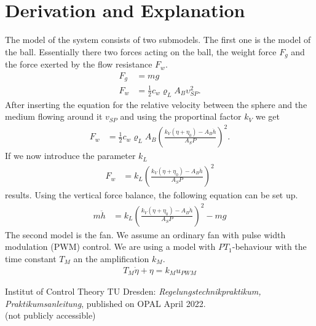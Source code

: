 \documentclass[10pt,a4paper]{article}
\begin{document}
	
	\section{Derivation and Explanation} %
	The model of the system consists of two submodels. The first one is the model of the ball. Essentially there two forces acting on the ball, the weight force $F_g$ and the force exerted by the flow resistance $F_w$.   
	\begin{align}
		F_g &= mg \\
		F_w &= \frac{1}{2} c_w \varrho_L A_B \upsilon_{SP}^2.
	\end{align}
	After inserting the equation for the relative velocity between the sphere and the medium flowing around it $v_{SP}$ and using the proportinal factor $k_V$ we get
	\begin{align}
		F_w &= \frac{1}{2} c_w \varrho_L A_B \left(\frac{k_V(\eta + \eta_0) - A_B \dot{h}}{A_SP}\right)^2.
	\end{align}
	If we now introduce the parameter $k_L$ 
	\begin{align}
		F_w &= k_L \left(\frac{k_V(\eta +\eta_0) - A_B\dot{h}}{A_SP}\right)^2
	\end{align} 
	results.
	Using the vertical force balance, the following equation can be set up.
	\begin{align}
		m\ddot{h}&= k_L \left(\frac{k_V(\eta +\eta_0) - A_B\dot{h}}{A_SP}\right)^2 -mg
	\end{align}
	The second model is the fan. We assume an ordinary fan with pulse width modulation (PWM) control. We are using a model with $PT_1$-behaviour with the time constant $T_M$ an the amplification $k_M$.
	\begin{align}
		T_M \dot{\eta} + \eta = k_Mu_{PWM}
	\end{align}    
	
	\begin{thebibliography}{10}		
		Institut of Control Theory TU Dresden: 
		\textit{Regelungstechnikpraktikum, Praktikumsanleitung}, published on OPAL April 2022. \\
		(not publicly accessible)
		
	\end{thebibliography}
\end{document}
